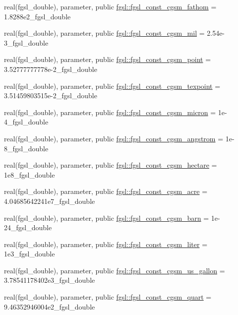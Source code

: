 \begin{DoxyCompactItemize}
real(fgsl\+\_\+double), parameter, public \hyperlink{namespacefgsl_a8351533377c64da8b76317b3172c1c76}{fgsl\+::fgsl\+\_\+const\+\_\+cgsm\+\_\+fathom} = 1.\+8288e2\+\_\+fgsl\+\_\+double
\item 
real(fgsl\+\_\+double), parameter, public \hyperlink{namespacefgsl_afa02507efeb6d20012bb31b69efa6291}{fgsl\+::fgsl\+\_\+const\+\_\+cgsm\+\_\+mil} = 2.\+54e-\/3\+\_\+fgsl\+\_\+double
\item 
real(fgsl\+\_\+double), parameter, public \hyperlink{namespacefgsl_a924bd137c2b9e9abffbc4edb9826b398}{fgsl\+::fgsl\+\_\+const\+\_\+cgsm\+\_\+point} = 3.\+52777777778e-\/2\+\_\+fgsl\+\_\+double
\item 
real(fgsl\+\_\+double), parameter, public \hyperlink{namespacefgsl_af0bb6a664a268b6db97ed93021e98828}{fgsl\+::fgsl\+\_\+const\+\_\+cgsm\+\_\+texpoint} = 3.\+51459803515e-\/2\+\_\+fgsl\+\_\+double
\item 
real(fgsl\+\_\+double), parameter, public \hyperlink{namespacefgsl_afa1f606b298574904dc1963ed870db4b}{fgsl\+::fgsl\+\_\+const\+\_\+cgsm\+\_\+micron} = 1e-\/4\+\_\+fgsl\+\_\+double
\item 
real(fgsl\+\_\+double), parameter, public \hyperlink{namespacefgsl_aedfe01763a71e3f82c2dee8a2586b442}{fgsl\+::fgsl\+\_\+const\+\_\+cgsm\+\_\+angstrom} = 1e-\/8\+\_\+fgsl\+\_\+double
\item 
real(fgsl\+\_\+double), parameter, public \hyperlink{namespacefgsl_a4d19d597ffc77fc0c1aa577276cab117}{fgsl\+::fgsl\+\_\+const\+\_\+cgsm\+\_\+hectare} = 1e8\+\_\+fgsl\+\_\+double
\item 
real(fgsl\+\_\+double), parameter, public \hyperlink{namespacefgsl_a6417ace541dc0310036197a333495c36}{fgsl\+::fgsl\+\_\+const\+\_\+cgsm\+\_\+acre} = 4.\+04685642241e7\+\_\+fgsl\+\_\+double
\item 
real(fgsl\+\_\+double), parameter, public \hyperlink{namespacefgsl_a96f3fd765f8469355c932e287e34f25a}{fgsl\+::fgsl\+\_\+const\+\_\+cgsm\+\_\+barn} = 1e-\/24\+\_\+fgsl\+\_\+double
\item 
real(fgsl\+\_\+double), parameter, public \hyperlink{namespacefgsl_aa765c28c4966a92d631fc0d4721e7160}{fgsl\+::fgsl\+\_\+const\+\_\+cgsm\+\_\+liter} = 1e3\+\_\+fgsl\+\_\+double
\item 
real(fgsl\+\_\+double), parameter, public \hyperlink{namespacefgsl_a9fdaf0160e636b5a341738f1038e6671}{fgsl\+::fgsl\+\_\+const\+\_\+cgsm\+\_\+us\+\_\+gallon} = 3.\+78541178402e3\+\_\+fgsl\+\_\+double
\item 
real(fgsl\+\_\+double), parameter, public \hyperlink{namespacefgsl_a1dd9210eaaf96e8f99597ede1f808892}{fgsl\+::fgsl\+\_\+const\+\_\+cgsm\+\_\+quart} = 9.\+46352946004e2\+\_\+fgsl\+\_\+double

\end{DoxyCompactItemize}
